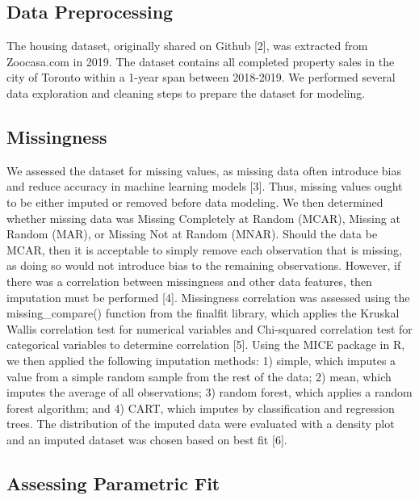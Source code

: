 \documentclass[11pt,]{article}
\begin{document}
\hypertarget{data-preprocessing}{%
\subsection{Data Preprocessing}\label{data-preprocessing}}

The housing dataset, originally shared on Github {[}2{]}, was extracted
from Zoocasa.com in 2019. The dataset contains all completed property
sales in the city of Toronto within a 1-year span between 2018-2019. We
performed several data exploration and cleaning steps to prepare the
dataset for modeling.

\hypertarget{missingness}{%
\subsection{Missingness}\label{missingness}}

We assessed the dataset for missing values, as missing data often
introduce bias and reduce accuracy in machine learning models {[}3{]}.
Thus, missing values ought to be either imputed or removed before data
modeling. We then determined whether missing data was Missing Completely
at Random (MCAR), Missing at Random (MAR), or Missing Not at Random
(MNAR). Should the data be MCAR, then it is acceptable to simply remove
each observation that is missing, as doing so would not introduce bias
to the remaining observations. However, if there was a correlation
between missingness and other data features, then imputation must be
performed {[}4{]}. Missingness correlation was assessed using the
missing\_compare() function from the finalfit library, which applies the
Kruskal Wallis correlation test for numerical variables and Chi-squared
correlation test for categorical variables to determine correlation
{[}5{]}. Using the MICE package in R, we then applied the following
imputation methods: 1) simple, which imputes a value from a simple
random sample from the rest of the data; 2) mean, which imputes the
average of all observations; 3) random forest, which applies a random
forest algorithm; and 4) CART, which imputes by classification and
regression trees. The distribution of the imputed data were evaluated
with a density plot and an imputed dataset was chosen based on best fit
{[}6{]}.

\hypertarget{assessing-parametric-fit}{%
\subsection{Assessing Parametric Fit}\label{assessing-parametric-fit}}
\end{document}
